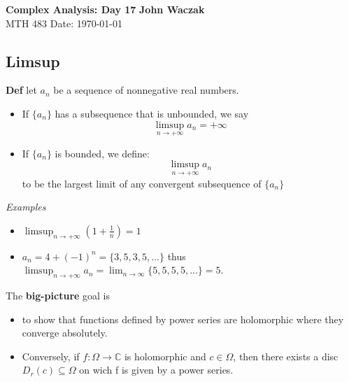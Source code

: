 \documentclass[a4paper, 11pt]{article}
\begin{document}
\noindent
\large\textbf{Complex Analysis: Day 17} \hfill \textbf{John Waczak} \\
\normalsize MTH 483 \hfill  Date: \today \\


\subsection*{Limsup} 
	\textbf{Def} let $a_n$ be a sequence of nonnegative real numbers. 
		\begin{itemize}
			\item If $\{a_n\}$ has a subsequence that is unbounded, we say
				\begin{equation*}
					\limsup_{n\rightarrow +\infty} a_n = + \infty
				\end{equation*}
			\item If $\{a_n\}$ is bounded, we define: 
				\begin{equation*}
					\limsup_{n\rightarrow +\infty} a_n 
				\end{equation*}
				to be the largest limit of any convergent subsequence of $\{a_n\}$
		\end{itemize}
		
	\noindent \textit{Examples} 
		\begin{itemize}
			\item $\limsup_{n\rightarrow+\infty}(1+\frac{1}{n}) = 1$ 
			\item $a_n = 4+(-1)^n = \{3, 5, 3, 5, ...\}$ thus $\limsup_{n\rightarrow+\infty} a_n = \lim_{n\rightarrow \infty}\{5,5,5,5,...\} = 5$. 
		\end{itemize}

	\noindent The \textbf{big-picture} goal is
		\begin{itemize}
			\item to show that functions defined by power series are holomorphic where they converge absolutely. 
			\item Conversely, if $f:\Omega\rightarrow\mathbb{C}$ is holomorphic and $c\in\Omega$, then there exists a disc $D_r(c)\subseteq \Omega$ on wich f is given by a power series. 
		\end{itemize} 
	
\end{document}
